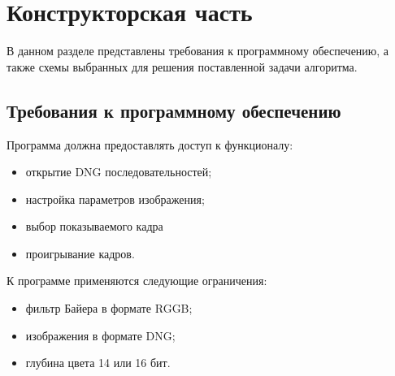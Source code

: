 \chapter{Конструкторская часть}

В данном разделе представлены требования к программному обеспечению, а также схемы выбранных для решения поставленной задачи алгоритма.

\section{Требования к программному обеспечению}

Программа должна предоставлять доступ к функционалу:
\begin{itemize}
	\item открытие DNG последовательностей;
	\item настройка параметров изображения;
	\item выбор показываемого кадра
	\item проигрывание кадров.
\end{itemize}

К программе применяются следующие ограничения:
\begin{itemize}
	\item фильтр Байера в формате RGGB;
	\item изображения в формате DNG;
	\item глубина цвета 14 или 16 бит.	
\end{itemize}

